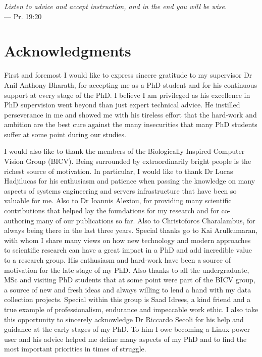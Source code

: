 
\begin{flushright}{\slshape    
   Listen to advice and accept instruction, and in the end you will be wise.} \\ \medskip
    --- Pr. 19:20
\end{flushright}



\bigskip

\begingroup
\let\clearpage\relax
\let\cleardoublepage\relax
\let\cleardoublepage\relax
\chapter*{Acknowledgments}

First and foremost I would like to express sincere gratitude to my supervisor Dr Anil Anthony Bharath, for accepting me as a PhD student and for his continuous support at every stage of the PhD. I believe I am privileged as his excellence in PhD supervision went beyond than just expert technical advice. He instilled perseverance in me and showed me with his tireless effort that the hard-work and ambition are the best cure against the many insecurities that many PhD students suffer at some point during our studies.

I would also like to thank the members of the Biologically Inspired Computer Vision Group (BICV). Being surrounded by extraordinarily bright people is the richest source of motivation. In particular, I would like to thank Dr Lucas Hadjilucas for his enthusiasm and patience when passing the knowledge on many aspects of systems engineering and servers infrastructure that have been so valuable for me. Also to Dr Ioannis Alexiou, for providing many scientific contributions that helped lay the foundations for my research and for co-authoring many of our publications so far. Also to Christoforos Charalambus, for always being there in the last three years. Special thanks go to Kai Arulkumaran, with whom I share many views on how new technology and modern approaches to scientific research can have a great impact in a PhD and add incredible value to a research group. His enthusiasm  and hard-work have been a source of motivation for the late stage of my PhD. Also thanks to all the undergraduate, MSc and visiting PhD students that at some point were part of the BICV group, a source of new and fresh ideas and always willing to lend a hand with my data collection projects. Special within this group is Saad Idrees, a kind friend and a true example of professionalism, endurance and impeccable work ethic. I also take this opportunity to sincerely acknowledge Dr Riccardo Secoli for his help and guidance at the early stages of my PhD. To him I owe becoming a Linux power user and his advice helped me define many aspects of my PhD and to find the most important priorities in times of struggle.

